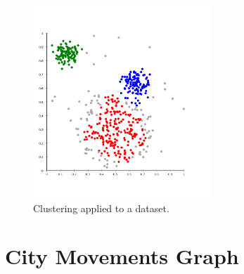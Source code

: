 \begin{figure}[!ht]
	\centering
	\includegraphics[width=0.6\textwidth]{images/clustering.png}
	\caption{ Clustering applied to a dataset. }
	\label{fig:clustering}
\end{figure} 

\FloatBarrier
\section{City Movements Graph}

\FloatBarrier